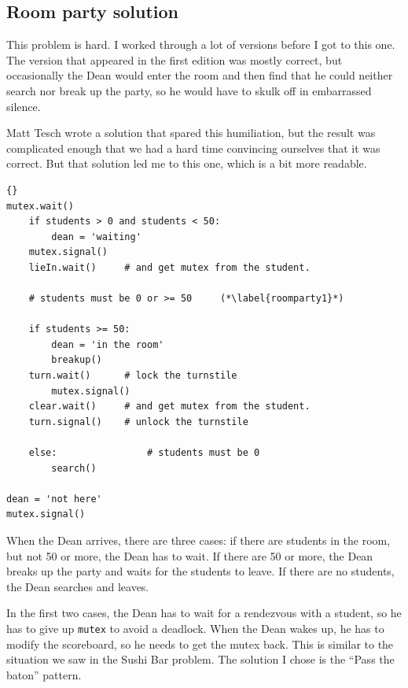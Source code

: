 \documentclass{book}
\begin{document}
\subsection {Room party solution}

This problem is hard.  I worked through a lot of versions before
I got to this one.  The version that appeared in the first edition
was mostly correct, but occasionally the Dean would enter the
room and then find that he could neither search nor break up the
party, so he would have to skulk off in embarrassed silence.

Matt Tesch wrote a solution that spared this humiliation, but the
result was complicated enough that we had a hard time convincing
ourselves that it was correct.  But that solution led me to this one,
which is a bit more readable.

\begin{lstlisting}[caption={Room party solution (dean)}]{}
mutex.wait()
    if students > 0 and students < 50:
        dean = 'waiting'
	mutex.signal()
	lieIn.wait()     # and get mutex from the student.

    # students must be 0 or >= 50     (*\label{roomparty1}*)

    if students >= 50:
        dean = 'in the room'
        breakup()
	turn.wait()      # lock the turnstile
        mutex.signal()
	clear.wait()     # and get mutex from the student.
	turn.signal()    # unlock the turnstile

    else:                # students must be 0
        search()

dean = 'not here'
mutex.signal() 
\end{lstlisting}

When the Dean arrives, there are three cases: if there are students in
the room, but not 50 or more, the Dean has to wait.  If there are 50
or more, the Dean breaks up the party and waits for the students to
leave.  If there are no students, the Dean searches and leaves.

In the first two cases, the Dean has to wait for a rendezvous with a
student, so he has to give up {\tt mutex} to avoid a deadlock.  When
the Dean wakes up, he has to modify the scoreboard, so he needs to get
the mutex back.  This is similar to the situation we saw in the Sushi
Bar problem.  The solution I chose is the ``Pass the baton'' pattern.
\end{document}
